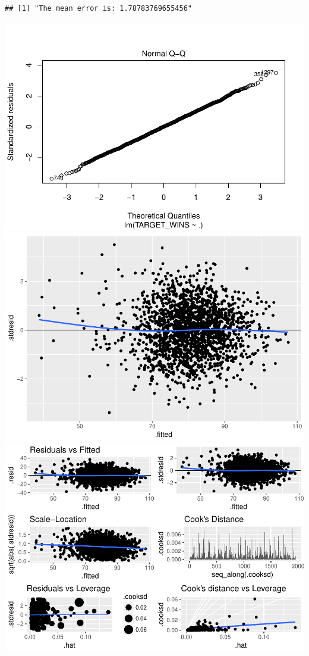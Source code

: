 \documentclass[]{article}
\begin{document}
\begin{verbatim}
## [1] "The mean error is: 1.78783769655456"
\end{verbatim}

\includegraphics{DATA_621_Homework_1_files/figure-latex/predict-plots-1.pdf}
\includegraphics{DATA_621_Homework_1_files/figure-latex/predict-plots-2.pdf}
\includegraphics{DATA_621_Homework_1_files/figure-latex/predict-plots-3.pdf}
\end{document}
